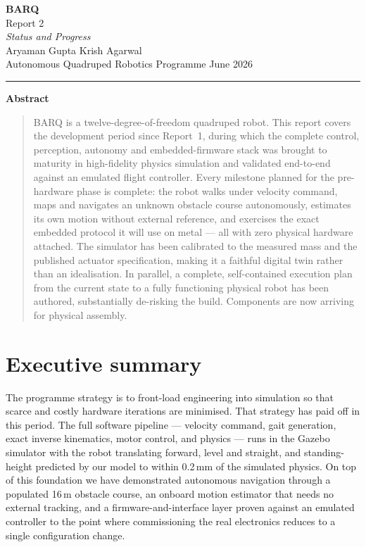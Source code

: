 \documentclass[11pt,a4paper]{article}
\begin{document}
\thispagestyle{fancy}

\begin{center}
  \vspace*{1cm}
  {\fontsize{40}{44}\selectfont\bfseries BARQ}\\[8pt]
  {\LARGE Report 2}\\[6pt]
  {\large\itshape Status and Progress}\\[16pt]
  {\large Aryaman Gupta \quad\textperiodcentered\quad Krish Agarwal}\\[4pt]
  {\normalsize Autonomous Quadruped Robotics Programme \;\textperiodcentered{} June 2026}\\[10pt]
  \rule{6cm}{0.4pt}
\end{center}

\vspace{4mm}
\begin{center}\textbf{Abstract}\end{center}
\begin{quote}\small
BARQ is a twelve-degree-of-freedom quadruped robot. This report covers the development period
since Report~1, during which the complete control, perception, autonomy and embedded-firmware
stack was brought to maturity in high-fidelity physics simulation and validated end-to-end against
an emulated flight controller. Every milestone planned for the pre-hardware phase is complete: the
robot walks under velocity command, maps and navigates an unknown obstacle course autonomously,
estimates its own motion without external reference, and exercises the exact embedded protocol it
will use on metal --- all with zero physical hardware attached. The simulator has been calibrated
to the measured mass and the published actuator specification, making it a faithful digital twin
rather than an idealisation. In parallel, a complete, self-contained execution plan from the
current state to a fully functioning physical robot has been authored, substantially de-risking the
build. Components are now arriving for physical assembly.
\end{quote}

\justifying

\section{Executive summary}
The programme strategy is to front-load engineering into simulation so that scarce and costly
hardware iterations are minimised. That strategy has paid off in this period. The full software
pipeline --- velocity command, gait generation, exact inverse kinematics, motor control, and
physics --- runs in the Gazebo simulator with the robot translating forward, level and straight,
and standing-height predicted by our model to within 0.2\,mm of the simulated physics. On top of
this foundation we have demonstrated autonomous navigation through a populated 16\,m obstacle
course, an onboard motion estimator that needs no external tracking, and a firmware-and-interface
layer proven against an emulated controller to the point where commissioning the real electronics
reduces to a single configuration change.
\end{document}
